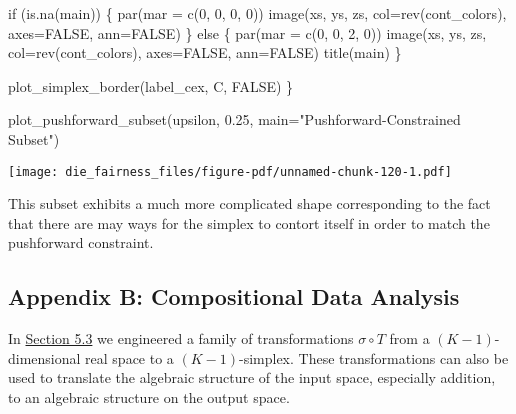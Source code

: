 \documentclass[
  letterpaper,
  DIV=11,
  numbers=noendperiod]{scrartcl}
\newenvironment{Shaded}{\begin{snugshade}}{\end{snugshade}}
\newcommand{\AttributeTok}[1]{\textcolor[rgb]{0.40,0.45,0.13}{#1}}
\newcommand{\ConstantTok}[1]{\textcolor[rgb]{0.56,0.35,0.01}{#1}}
\newcommand{\ControlFlowTok}[1]{\textcolor[rgb]{0.00,0.23,0.31}{#1}}
\newcommand{\DecValTok}[1]{\textcolor[rgb]{0.68,0.00,0.00}{#1}}
\newcommand{\FloatTok}[1]{\textcolor[rgb]{0.68,0.00,0.00}{#1}}
\newcommand{\FunctionTok}[1]{\textcolor[rgb]{0.28,0.35,0.67}{#1}}
\newcommand{\NormalTok}[1]{\textcolor[rgb]{0.00,0.23,0.31}{#1}}
\newcommand{\StringTok}[1]{\textcolor[rgb]{0.13,0.47,0.30}{#1}}
\begin{document}
\begin{Shaded}
\begin{Highlighting}[]
  \ControlFlowTok{if}\NormalTok{ (}\FunctionTok{is.na}\NormalTok{(main)) \{}
    \FunctionTok{par}\NormalTok{(}\AttributeTok{mar =} \FunctionTok{c}\NormalTok{(}\DecValTok{0}\NormalTok{, }\DecValTok{0}\NormalTok{, }\DecValTok{0}\NormalTok{, }\DecValTok{0}\NormalTok{))}
    \FunctionTok{image}\NormalTok{(xs, ys, zs, }\AttributeTok{col=}\FunctionTok{rev}\NormalTok{(cont\_colors), }\AttributeTok{axes=}\ConstantTok{FALSE}\NormalTok{, }\AttributeTok{ann=}\ConstantTok{FALSE}\NormalTok{)}
\NormalTok{  \} }\ControlFlowTok{else}\NormalTok{ \{}
    \FunctionTok{par}\NormalTok{(}\AttributeTok{mar =} \FunctionTok{c}\NormalTok{(}\DecValTok{0}\NormalTok{, }\DecValTok{0}\NormalTok{, }\DecValTok{2}\NormalTok{, }\DecValTok{0}\NormalTok{))}
    \FunctionTok{image}\NormalTok{(xs, ys, zs, }\AttributeTok{col=}\FunctionTok{rev}\NormalTok{(cont\_colors), }\AttributeTok{axes=}\ConstantTok{FALSE}\NormalTok{, }\AttributeTok{ann=}\ConstantTok{FALSE}\NormalTok{)}
    \FunctionTok{title}\NormalTok{(main)}
\NormalTok{  \}}

  \FunctionTok{plot\_simplex\_border}\NormalTok{(label\_cex, C, }\ConstantTok{FALSE}\NormalTok{)}
\NormalTok{\}}
\end{Highlighting}
\end{Shaded}

\begin{Shaded}
\begin{Highlighting}[]
\FunctionTok{plot\_pushforward\_subset}\NormalTok{(upsilon, }\FloatTok{0.25}\NormalTok{, }\AttributeTok{main=}\StringTok{"Pushforward{-}Constrained Subset"}\NormalTok{)}
\end{Highlighting}
\end{Shaded}

\texttt{[image: die\_fairness\_files/figure-pdf/unnamed-chunk-120-1.pdf]}

This subset exhibits a much more complicated shape corresponding to the
fact that there are may ways for the simplex to contort itself in order
to match the pushforward constraint.

\subsection*{Appendix B: Compositional Data
Analysis}\label{sec:appendixb}

In \href{@sec:transformedpop}{Section 5.3} we engineered a family of
transformations \(\sigma \circ T\) from a \((K - 1)\)-dimensional real
space to a \((K - 1)\)-simplex. These transformations can also be used
to translate the algebraic structure of the input space, especially
addition, to an algebraic structure on the output space.
\end{document}
